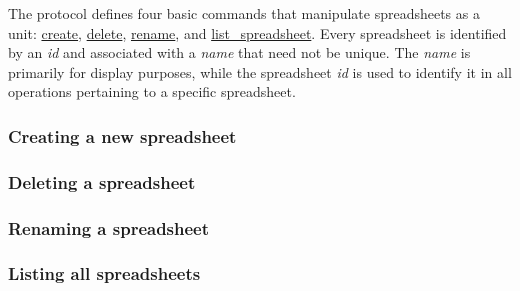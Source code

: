 The protocol defines four basic commands that manipulate spreadsheets as 
a unit: \hyperref[sec:message:create]{create}, \hyperref[sec:message:delete]{delete}, 
\hyperref[sec:message:rename]{rename}, and 
\hyperref[sec:message:list]{list\_spreadsheet}. 
Every spreadsheet is identified by an \emph{id} and associated with a \emph{name} that 
need not be unique. The \emph{name} is primarily for display purposes, while the 
spreadsheet \emph{id} is used to identify it in all operations pertaining to a 
specific spreadsheet.

\subsubsection{Creating a new spreadsheet}


\subsubsection{Deleting a spreadsheet}


\subsubsection{Renaming a spreadsheet}


\subsubsection{Listing all spreadsheets}
